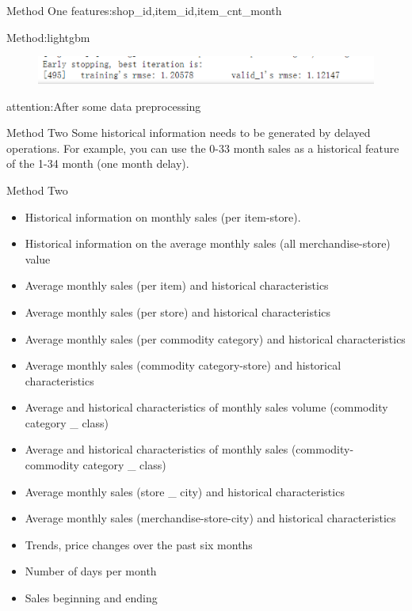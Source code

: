 \documentclass[
 size=14pt,
 paper=smartboard,  %
 mode=present, 		%
 display=slides, 	%
 style=tuliplab,  	%
 pauseslide,
 fleqn,leqno]{powerdot}
\begin{document}
\begin{slide}[toc=,bm=]{Method One}
  features:shop_id,item_id,item_cnt_month\par
  Method:lightgbm
  \begin{figure}
    \includegraphics[scale=0.5]{picture/data_14.eps}
  \end{figure}
  attention:After some data preprocessing
\end{slide}

\begin{slide}[toc=,bm=]{Method Two}
  Some historical information needs to be generated by delayed operations. For example, you can use the 0-33 month sales as a historical feature of the 1-34 month (one month delay).
\end{slide}

\begin{slide}[toc=,bm=]{Method Two}
  \begin{itemize}
    \item Historical information on monthly sales (per item-store).
    \item Historical information on the average monthly sales (all merchandise-store) value
    \item Average monthly sales (per item) and historical characteristics
    \item Average monthly sales (per store) and historical characteristics
    \item Average monthly sales (per commodity category) and historical characteristics
    \item Average monthly sales (commodity category-store) and historical characteristics
    \item Average and historical characteristics of monthly sales volume (commodity category _ class)
    \item Average and historical characteristics of monthly sales (commodity-commodity category _ class)
    \item Average monthly sales (store _ city) and historical characteristics
    \item Average monthly sales (merchandise-store-city) and historical characteristics
    \item Trends, price changes over the past six months
    \item Number of days per month
    \item Sales beginning and ending
  \end{itemize}
\end{slide}
\end{document}
